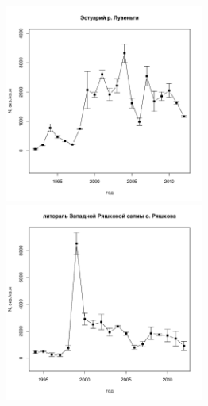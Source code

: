 \documentclass[12pt, a4paper]{disser}
\begin{document}
\begin{figure}[h]
	\begin{minipage}[b]{.46\linewidth}
	\begin{center}
		\includegraphics[width=65mm]{../White_Sea/Estuatiy_Luvenga/N2_dynamic.pdf}
	\end{center}
	\end{minipage}
%
	\hfil %
%
	\begin{minipage}[b]{.46\linewidth}
	\begin{center}
		\includegraphics[width=65mm]{../White_Sea/Ryashkov_ZRS/N2_dynamic.pdf}
	\end{center}
	\end{minipage}



\end{figure}
\end{document}
